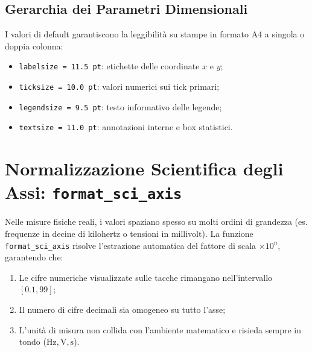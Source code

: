 \documentclass[11pt,a4paper]{article}
\begin{document}
\subsection{Gerarchia dei Parametri Dimensionali}
I valori di default garantiscono la leggibilità su stampe in formato A4 a singola o doppia colonna:
\begin{itemize}
    \item \texttt{labelsize = 11.5\,pt}: etichette delle coordinate $x$ e $y$;
    \item \texttt{ticksize = 10.0\,pt}: valori numerici sui tick primari;
    \item \texttt{legendsize = 9.5\,pt}: testo informativo delle legende;
    \item \texttt{textsize = 11.0\,pt}: annotazioni interne e box statistici.
\end{itemize}

\newpage

\section{Normalizzazione Scientifica degli Assi: \texttt{format\_sci\_axis}}

Nelle misure fisiche reali, i valori spaziano spesso su molti ordini di grandezza (es. frequenze in decine di kilohertz o tensioni in millivolt). La funzione \texttt{format\_sci\_axis} risolve l'estrazione automatica del fattore di scala $\times 10^n$, garantendo che:
\begin{enumerate}
    \item Le cifre numeriche visualizzate sulle tacche rimangano nell'intervallo $[0.1, 99]$;
    \item Il numero di cifre decimali sia omogeneo su tutto l'asse;
    \item L'unità di misura non collida con l'ambiente matematico e risieda sempre in tondo ($\mathrm{Hz}, \mathrm{V}, \mathrm{s}$).
\end{enumerate}
\end{document}
